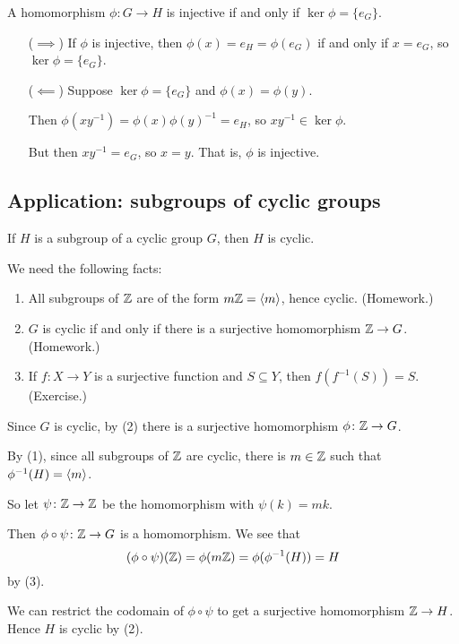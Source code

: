 \documentclass[12pt,letterpaper]{report}
\begin{document}
\begin{prop}{}{}
  A homomorphism $\phi \colon G \to H$ is injective if and only if $\ker \phi = \{e_G\}$.
\end{prop}

\begin{thmproof}
  \begin{enumerate}[leftmargin=4em]
    \item[($\implies$)]
    If $\phi$ is injective, then $\phi(x) = e_H = \phi(e_G)$ if and only if $x = e_G$, so
    $\ker \phi = \{e_G\}$.
    \item[($\impliedby$)]
    Suppose $\ker \phi = \{e_G\}$ and $\phi(x) = \phi(y)$.

    Then $\phi(xy^{-1}) = \phi(x)\phi(y)^{-1} = e_H$, so $xy^{-1} \in \ker \phi$.

    But then $xy^{-1} = e_G$, so $x = y$.
    That is, $\phi$ is injective.
  \end{enumerate}
\end{thmproof}

\pagebreak
\subsection{Application: subgroups of cyclic groups}

\begin{prop}{}{}
  If $H$ is a subgroup of a cyclic group $G$, then $H$ is cyclic.
\end{prop}

\begin{thmproof}
  We need the following facts:
  \begin{enumerate}
    \item All subgroups of $\mathbb{Z}$ are of the form $m\mathbb{Z} = \langle m\rangle$, hence cyclic.
    (Homework.)
    \item $G$ is cyclic if and only if there is a surjective homomorphism $\mathbb{Z} \to G$.
    (Homework.)
    \item If $f \colon X \to Y$ is a surjective function and $S \subseteq Y$, then
    $f(f^{-1}(S)) = S$.
    (Exercise.)
  \end{enumerate}

  Since $G$ is cyclic, by (2) there is a surjective homomorphism $\phi \colon \mathbb{Z} \to G$.

  By (1), since all subgroups of $\mathbb{Z}$ are cyclic, there is $m \in \mathbb{Z}$ such that
  $\phi^{-1}(H) = \langle m\rangle$.

  So let $\psi \colon \mathbb{Z} \to \mathbb{Z}$ be the homomorphism with $\psi(k) = mk$.

  Then $\phi \circ \psi \colon \mathbb{Z} \to G$ is a homomorphism.
  We see that
  \[ (\phi \circ \psi)(\mathbb{Z}) = \phi(m\mathbb{Z}) = \phi(\phi^{-1}(H)) = H \]
  by (3).

  We can restrict the codomain of $\phi \circ \psi$ to get a surjective homomorphism
  $\mathbb{Z} \to H$.
  Hence $H$ is cyclic by (2).
\end{thmproof}
\end{document}
